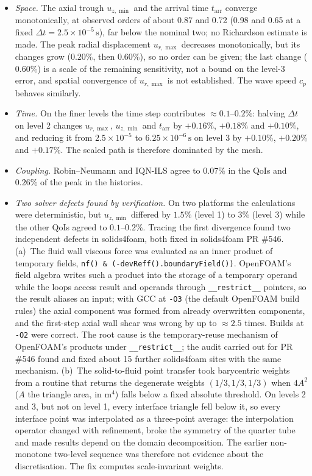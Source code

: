 \begin{itemize}
	\item \emph{Space.} The axial trough $u_{z,\min}$ and the arrival time $t_\mathrm{arr}$ converge monotonically, at observed orders of about 0.87 and 0.72 (0.98 and 0.65 at a fixed $\Delta t = 2.5\times10^{-5}\,\mathrm{s}$), far below the nominal two; no Richardson estimate is made. The peak radial displacement $u_{r,\max}$ decreases monotonically, but its changes grow ($0.20\%$, then $0.60\%$), so no order can be given; the last change ($0.60\%$) is a scale of the remaining sensitivity, not a bound on the level-3 error, and spatial convergence of $u_{r,\max}$ is not established. The wave speed $c_p$ behaves similarly.
	\item \emph{Time.} On the finer levels the time step contributes $\approx0.1$--$0.2\%$: halving $\Delta t$ on level 2 changes $u_{r,\max}$, $u_{z,\min}$ and $t_\mathrm{arr}$ by $+0.16\%$, $+0.18\%$ and $+0.10\%$, and reducing it from $2.5\times10^{-5}$ to $6.25\times10^{-6}\,\mathrm{s}$ on level 3 by $+0.10\%$, $+0.20\%$ and $+0.17\%$. The scaled path is therefore dominated by the mesh.
	\item \emph{Coupling.} Robin--Neumann and IQN-ILS agree to $0.07\%$ in the QoIs and $0.26\%$ of the peak in the histories.
	\item \emph{Two solver defects found by verification.} On two platforms the calculations were deterministic, but $u_{z,\min}$ differed by $1.5\%$ (level 1) to $3\%$ (level 3) while the other QoIs agreed to $0.1$--$0.2\%$. Tracing the first divergence found two independent defects in solids4foam, both fixed in solids4foam PR \#546.
	(a)~The fluid wall viscous force was evaluated as an inner product of temporary fields, \texttt{nf() \& (-devReff().boundaryField())}. OpenFOAM's field algebra writes such a product into the storage of a temporary operand while the loops access result and operands through \texttt{\_\_restrict\_\_} pointers, so the result aliases an input; with GCC at \texttt{-O3} (the default OpenFOAM build rules) the axial component was formed from already overwritten components, and the first-step axial wall shear was wrong by up to $\approx2.5$ times. Builds at \texttt{-O2} were correct. The root cause is the temporary-reuse mechanism of OpenFOAM's products under \texttt{\_\_restrict\_\_}; the audit carried out for PR \#546 found and fixed about 15 further solids4foam sites with the same mechanism.
	(b)~The solid-to-fluid point transfer took barycentric weights from a routine that returns the degenerate weights $(1/3, 1/3, 1/3)$ when $4A^2$ ($A$ the triangle area, in $\mathrm{m}^4$) falls below a fixed absolute threshold. On levels 2 and 3, but not on level 1, every interface triangle fell below it, so every interface point was interpolated as a three-point average: the interpolation operator changed with refinement, broke the symmetry of the quarter tube and made results depend on the domain decomposition. The earlier non-monotone two-level sequence was therefore not evidence about the discretisation. The fix computes scale-invariant weights.

\end{itemize}
